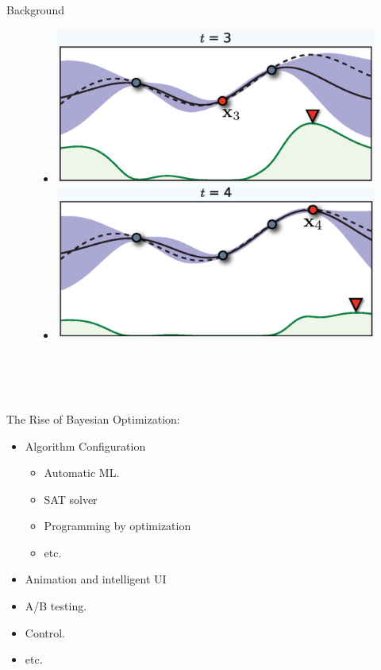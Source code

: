 \documentclass[final]{beamer}
\begin{document}
\begin{frame}[t]
\begin{columns}[T]
\begin{column}{.48\textwidth}
\begin{block}{Background}
\begin{minipage}[l]{0.45\columnwidth}
\begin{figure}
\begin{itemize}
    \item[] \includegraphics[width=0.75\columnwidth]{../Presentation//figs/bo2}
    \item[] \includegraphics[width=0.75\columnwidth]{../Presentation//figs/bo3}
   \end{itemize}
  \end{figure}
  \end{minipage}
  \\~\\~\\
  \begin{minipage}[l]{0.63\columnwidth}
  The Rise of Bayesian Optimization: 
     \begin{itemize}
   \item Algorithm Configuration
   \begin{itemize}
    \item Automatic ML.
    \item SAT solver
    \item Programming by optimization
    \item etc.
   \end{itemize}
   \item Animation and intelligent UI
   \item A/B testing.
   \item Control.
   \item etc.
   \end{itemize}
    \end{minipage}
  \begin{minipage}[r]{0.35\columnwidth}
     \begin{figure}[t]

\end{figure}
\end{minipage}
\end{block}
\end{column}
\end{columns}
\end{frame}
\end{document}
